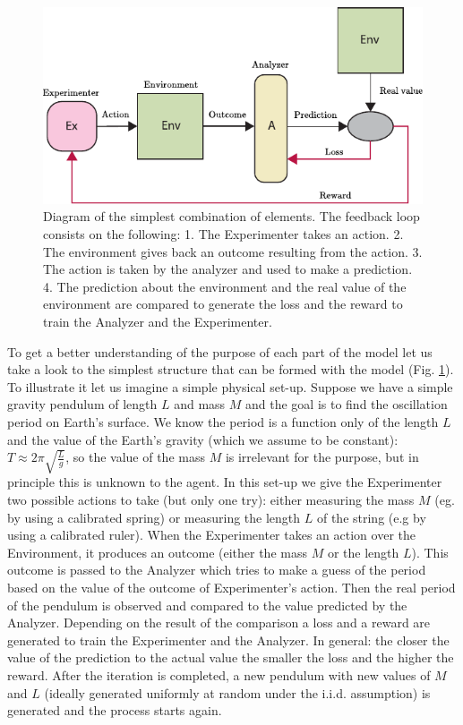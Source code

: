 \documentclass[11pt,a4paper,twoside]{report}
\newcommand{\+}{\textnormal{+} }
\theoremstyle{definition}
\numberwithin{equation}{chapter}
\begin{document}
\begin{figure}
  \centering
  \includegraphics{figures/SimpleSetUp.pdf}
  \caption{Diagram of the simplest combination of elements. The feedback loop
  consists on the following: 1. The Experimenter takes an action. 2. The
  environment gives back an outcome resulting from the action. 3. The action is
  taken by the analyzer and used to make a prediction. 4. The prediction about
  the environment and the real value of the environment are compared to generate
  the loss and the reward to train the Analyzer and the Experimenter.}
  \label{fig:simplesetup}
\end{figure}

To get a better understanding of the purpose of each part of the model let us
take a look to the simplest structure that can be formed with the model (Fig.
\ref{fig:simplesetup}). To illustrate it let us imagine a simple physical set-up.
Suppose we have a simple gravity pendulum of length $L$ and mass $M$ and the
goal is to find the oscillation period on Earth's surface. We know the period is
a function only of the length $L$ and the value of the Earth's gravity (which we
assume to be constant): $T \approx 2\pi\sqrt{\frac{L}{g}}$, so the value of the
mass $M$ is irrelevant for the purpose, but in principle this is unknown to the
agent. In this set-up we give the Experimenter two possible actions to take (but
only one try): either measuring the mass $M$ (eg. by using a calibrated spring)
or measuring the length $L$ of the string (e.g by using a calibrated ruler).
When the Experimenter takes an action over the Environment, it produces an
outcome (either the mass $M$ or the length $L$). This outcome is passed to the
Analyzer which tries to make a guess of the period based on the value of the
outcome of Experimenter's action. Then the real period of the pendulum is
observed and compared to the value predicted by the Analyzer. Depending on the
result of the comparison a loss and a reward are generated to train the
Experimenter and the Analyzer. In general: the closer the value of the
prediction to the actual value the smaller the loss and the higher the reward.
After the iteration is completed, a new pendulum with new values of $M$ and $L$
(ideally generated uniformly at random under the i.i.d. assumption) is generated
and the process starts again.
\end{document}
